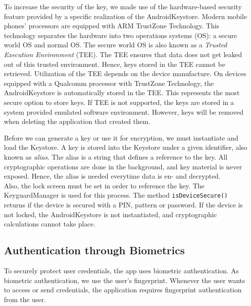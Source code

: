 To increase the security of the key, we made use of the hardware-based security feature provided by a specific realization of the AndroidKeystore. Modern mobile phones' processors are equipped with ARM TrustZone Technology. \cite{DBLP:conf/ccs/CooijmansRP14} This technology separates the hardware into two operations systems (OS): a secure world OS and normal OS. The secure world OS is also known as a \textit{Trusted Execution Environment} (TEE). The TEE ensures that data does not get leaked out of this trusted environment. Hence, keys stored in the TEE cannot be retrieved. Utilization of the TEE depends on the device manufacture. On devices equipped with a Qualcomm processor with TrustZone Technology, the AndroidKeystore is automatically stored in the TEE. \cite{DBLP:conf/ccs/CooijmansRP14} This represents the most secure option to store keys. \cite{SecureDataEncryption} If TEE is not supported, the keys are stored in a system provided emulated software environment. However, keys will be removed when deleting the application that created them.

Before we can generate a key or use it for encryption, we must instantiate and load the Keystore.
A key is stored into the Keystore under a given identifier, also known as \textit{alias}. \cite{DBLP:conf/ccs/CooijmansRP14} The alias is a string that defines a reference to the key. All cryptographic operations are done in the background, and key material is never exposed. Hence, the alias is needed everytime data is en- and decrypted. \\
Also, the lock screen must be set in order to reference the key. The KeyguardManager is used for this process. The method \texttt{isDeviceSecure()} returns if the device is secured with a PIN, pattern or password. If the device is not locked, the AndroidKeystore is not instantiated, and cryptographic calculations cannot take place. \\




\subsection{Authentication through Biometrics}
To securely protect user credentials, the app uses biometric authentication. As biometric authentication, we use the user's fingerprint. Whenever the user wants to access or send credentials, the application requires fingerprint authentication from the user.

